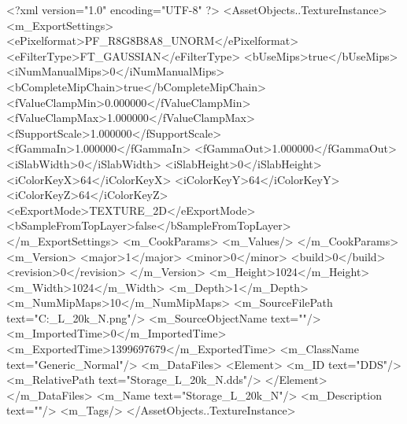 <?xml version="1.0" encoding="UTF-8" ?>
<AssetObjects..TextureInstance>
	<m_ExportSettings>
		<ePixelformat>PF_R8G8B8A8_UNORM</ePixelformat>
		<eFilterType>FT_GAUSSIAN</eFilterType>
		<bUseMips>true</bUseMips>
		<iNumManualMips>0</iNumManualMips>
		<bCompleteMipChain>true</bCompleteMipChain>
		<fValueClampMin>0.000000</fValueClampMin>
		<fValueClampMax>1.000000</fValueClampMax>
		<fSupportScale>1.000000</fSupportScale>
		<fGammaIn>1.000000</fGammaIn>
		<fGammaOut>1.000000</fGammaOut>
		<iSlabWidth>0</iSlabWidth>
		<iSlabHeight>0</iSlabHeight>
		<iColorKeyX>64</iColorKeyX>
		<iColorKeyY>64</iColorKeyY>
		<iColorKeyZ>64</iColorKeyZ>
		<eExportMode>TEXTURE_2D</eExportMode>
		<bSampleFromTopLayer>false</bSampleFromTopLayer>
	</m_ExportSettings>
	<m_CookParams>
		<m_Values/>
	</m_CookParams>
	<m_Version>
		<major>1</major>
		<minor>0</minor>
		<build>0</build>
		<revision>0</revision>
	</m_Version>
	<m_Height>1024</m_Height>
	<m_Width>1024</m_Width>
	<m_Depth>1</m_Depth>
	<m_NumMipMaps>10</m_NumMipMaps>
	<m_SourceFilePath text="C:\Users\Shadow\Desktop\Prototypes\Storage_L_20k_N.png"/>
	<m_SourceObjectName text=""/>
	<m_ImportedTime>0</m_ImportedTime>
	<m_ExportedTime>1399697679</m_ExportedTime>
	<m_ClassName text="Generic_Normal"/>
	<m_DataFiles>
		<Element>
			<m_ID text="DDS"/>
			<m_RelativePath text="Storage_L_20k_N.dds"/>
		</Element>
	</m_DataFiles>
	<m_Name text="Storage_L_20k_N"/>
	<m_Description text=""/>
	<m_Tags/>
</AssetObjects..TextureInstance>

